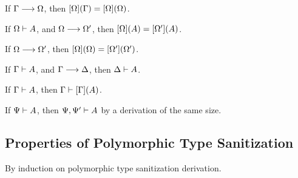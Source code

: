 \begin{lemma}
  \label{lemma:dunfield:StabilityOfCompleteContexts}
  If $\Gamma \longrightarrow \Omega $,
  then $[\Omega](\Gamma) = [\Omega](\Omega) $.
\end{lemma}

\begin{lemma}
  \label{lemma:dunfield:FinishingTypes}
  If $\Omega \vdash A $,
  and $\Omega \longrightarrow \Omega' $,
  then $[\Omega](A) = [\Omega'](A) $.
\end{lemma}

\begin{lemma}
  \label{lemma:dunfield:FinishingCompletions}
  If $\Omega \longrightarrow \Omega' $,
  then $[\Omega](\Omega) = [\Omega'](\Omega') $.
\end{lemma}

\begin{lemma}
  \label{lemma:dunfield:ExtensionWeakening}
  If $\Gamma \vdash A$,
  and $\Gamma \longrightarrow \Delta$,
  then  $\Delta \vdash A$.
\end{lemma}

\begin{lemma}
  \label{lemma:dunfield:SubstitutionTyping}
  If $\Gamma \vdash A$,
  then  $\Gamma \vdash [\Gamma](A)$.
\end{lemma}

\begin{proposition}[Weakening]
  \label{lemma:dunfield:Weakening}
  If $\Psi \vdash A$,
  then  $\Psi, \Psi' \vdash A$ by a derivation of the same size.
\end{proposition}

\subsection{Properties of Polymorphic Type Sanitization}

\begin{lemma}[\PolymorphicTypeSanitizationExtensionName]\leavevmode
  \label{lemma:\PolymorphicTypeSanitizationExtensionName}
  \PolymorphicTypeSanitizationExtensionBody
\end{lemma}

\proof

By induction on polymorphic type sanitization derivation.

